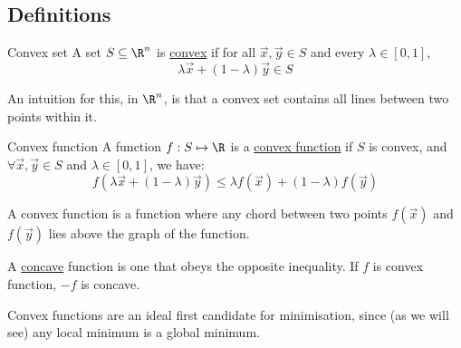 \documentclass[../Main.tex]{subfiles}
\begin{document}
\subsection{Definitions}
\begin{definition}{Convex set}
    A set $S \subseteq \R^n$ is \underline{convex} if for all $\vec{x}, \vec{y} \in S$ and every $\lambda \in [0, 1]$,
    \begin{equation*}
        \lambda \vec{x} + (1 - \lambda) \vec{y} \in S
    \end{equation*}
\end{definition}
\begin{remark}
    An intuition for this, in $\R^n$, is that a convex set contains all lines between two points within it.
\end{remark}
\begin{definition}{Convex function}
    A function $f : S \mapsto \R$ is a \underline{convex function} if $S$ is convex, and $\forall \vec{x}, \vec{y} \in S$ and $\lambda \in [0, 1]$, we have:
    \begin{equation*}
        f(\lambda \vec{x} + (1-\lambda)\vec{y}) \leq \lambda f(\vec{x}) + (1 - \lambda) f(\vec{y})
    \end{equation*}
\end{definition}
\begin{remarks}
    \item A convex function is a function where any chord between two points $f(\vec{x})$ and $f(\vec{y})$ lies above the graph of the function.
    \item A \underline{concave} function is one that obeys the opposite inequality. If $f$ is convex function, $-f$ is concave.
    \item Convex functions are an ideal first candidate for minimisation, since (as we will see) any local minimum is a global minimum.
\end{remarks}
\end{document}
